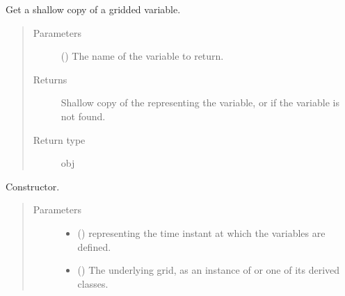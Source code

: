 \documentclass[letterpaper,10pt,english]{sphinxmanual}
\begin{document}
\begin{fulllineitems}
\begin{fulllineitems}
\label{\detokenize{api:storages.grid_data.GridData.__getitem__}}
Get a shallow copy of a gridded variable.
\begin{quote}\begin{description}
\item[{Parameters}] \leavevmode
{} () \textendash{} The name of the variable to return.

\item[{Returns}] \leavevmode
Shallow copy of the  representing the variable, or  if the variable is not found.

\item[{Return type}] \leavevmode
obj

\end{description}\end{quote}

\end{fulllineitems}


\begin{fulllineitems}
\label{\detokenize{api:storages.grid_data.GridData.__iadd__}}
\end{fulllineitems}


\begin{fulllineitems}
\label{\detokenize{api:storages.grid_data.GridData.__init__}}
Constructor.
\begin{quote}\begin{description}
\item[{Parameters}] \leavevmode\begin{itemize}
\item {} 
 () \textendash{}  representing the time instant at which the variables are defined.

\item {} 
 () \textendash{} The underlying grid, as an instance of {\hyperref[\detokenize{api:grids.grid_xyz.GridXYZ}]{}} or one of its derived classes.


\end{itemize}
\end{description}
\end{quote}
\end{fulllineitems}
\end{fulllineitems}
\end{document}

